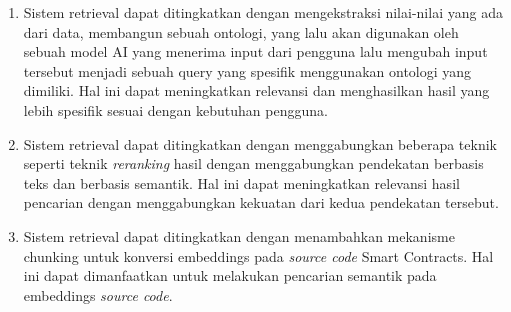 \begin{enumerate}
	\item Sistem retrieval dapat ditingkatkan dengan mengekstraksi nilai-nilai yang ada dari data, membangun sebuah ontologi, yang lalu akan digunakan oleh sebuah model AI yang menerima input dari pengguna lalu mengubah input tersebut menjadi sebuah query yang spesifik menggunakan ontologi yang dimiliki. Hal ini dapat meningkatkan relevansi dan menghasilkan hasil yang lebih spesifik sesuai dengan kebutuhan pengguna.
	\item Sistem retrieval dapat ditingkatkan dengan menggabungkan beberapa teknik seperti teknik \textit{reranking} hasil dengan menggabungkan pendekatan berbasis teks dan berbasis semantik. Hal ini dapat meningkatkan relevansi hasil pencarian dengan menggabungkan kekuatan dari kedua pendekatan tersebut.
	\item Sistem retrieval dapat ditingkatkan dengan menambahkan mekanisme chunking untuk konversi embeddings pada \textit{source code} Smart Contracts. Hal ini dapat dimanfaatkan untuk melakukan pencarian semantik pada embeddings \textit{source code}.
\end{enumerate}

